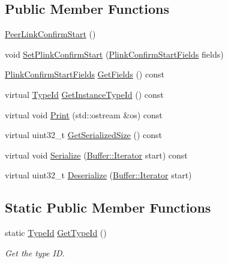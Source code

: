 \subsection*{Public Member Functions}
\begin{DoxyCompactItemize}
\item 
\hyperlink{classns3_1_1dot11s_1_1PeerLinkConfirmStart_ab49c5339d7c38026783d084dc2cfd994}{Peer\+Link\+Confirm\+Start} ()
\item 
void \hyperlink{classns3_1_1dot11s_1_1PeerLinkConfirmStart_a470a52f4ec0f19b01f5fcb986364af76}{Set\+Plink\+Confirm\+Start} (\hyperlink{structns3_1_1dot11s_1_1PeerLinkConfirmStart_1_1PlinkConfirmStartFields}{Plink\+Confirm\+Start\+Fields} fields)
\item 
\hyperlink{structns3_1_1dot11s_1_1PeerLinkConfirmStart_1_1PlinkConfirmStartFields}{Plink\+Confirm\+Start\+Fields} \hyperlink{classns3_1_1dot11s_1_1PeerLinkConfirmStart_a5e0f00ada2498955279791bcf96951f7}{Get\+Fields} () const 
\item 
virtual \hyperlink{classns3_1_1TypeId}{Type\+Id} \hyperlink{classns3_1_1dot11s_1_1PeerLinkConfirmStart_ad1b86e628a3ae682c7cb75802f5eff70}{Get\+Instance\+Type\+Id} () const 
\item 
virtual void \hyperlink{classns3_1_1dot11s_1_1PeerLinkConfirmStart_a6043bee5a5d2124cc958929bba71f8bf}{Print} (std\+::ostream \&os) const 
\item 
virtual uint32\+\_\+t \hyperlink{classns3_1_1dot11s_1_1PeerLinkConfirmStart_aa744406006fa412f4d7ce98bd860937a}{Get\+Serialized\+Size} () const 
\item 
virtual void \hyperlink{classns3_1_1dot11s_1_1PeerLinkConfirmStart_ae31536d19dbb8eb5e76ca881e4798e48}{Serialize} (\hyperlink{classns3_1_1Buffer_1_1Iterator}{Buffer\+::\+Iterator} start) const 
\item 
virtual uint32\+\_\+t \hyperlink{classns3_1_1dot11s_1_1PeerLinkConfirmStart_a6109a09962014a5c64c7a2fd9470978e}{Deserialize} (\hyperlink{classns3_1_1Buffer_1_1Iterator}{Buffer\+::\+Iterator} start)
\end{DoxyCompactItemize}
\subsection*{Static Public Member Functions}
\begin{DoxyCompactItemize}
\item 
static \hyperlink{classns3_1_1TypeId}{Type\+Id} \hyperlink{classns3_1_1dot11s_1_1PeerLinkConfirmStart_aa0ce9199a3e68a37755855a9d4f5817c}{Get\+Type\+Id} ()
\begin{DoxyCompactList}\small\item\em Get the type ID. \end{DoxyCompactList}\end{DoxyCompactItemize}
